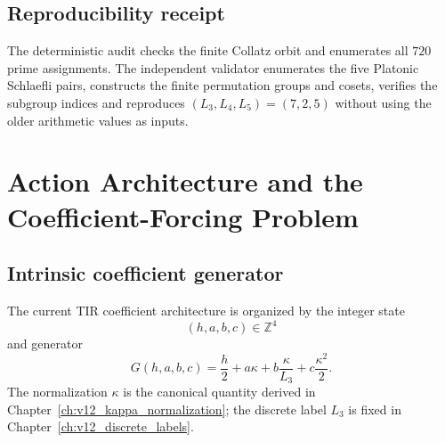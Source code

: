 \section{Reproducibility receipt}

The deterministic audit
checks the finite Collatz orbit and enumerates all \(720\) prime assignments.
The independent validator
enumerates the five Platonic Schlaefli pairs, constructs the finite permutation
groups and cosets, verifies the subgroup indices and reproduces
\((L_3,L_4,L_5)=(7,2,5)\) without using the older arithmetic values as inputs.

\clearpage

\chapter[Action Architecture and Coefficient Forcing]{Action Architecture and the Coefficient-Forcing Problem}
\label{ch:v12_action_coefficients}

\section{Intrinsic coefficient generator}
The current TIR coefficient architecture is organized by the integer state
\begin{equation}
\boxed{(h,a,b,c)\in\mathbb Z^4}
\label{eq:v12-coefficient-state}
\end{equation}
and generator
\begin{equation}
\boxed{
G(h,a,b,c)
=\frac h2
+a\kappa
+b\frac{\kappa}{L_3}
+c\frac{\kappa^2}{2}.
}
\label{eq:v12-coefficient-generator}
\end{equation}
The normalization $\kappa$ is the canonical quantity derived in
Chapter~\ref{ch:v12_kappa_normalization}; the discrete label $L_3$ is fixed in
Chapter~\ref{ch:v12_discrete_labels}.


